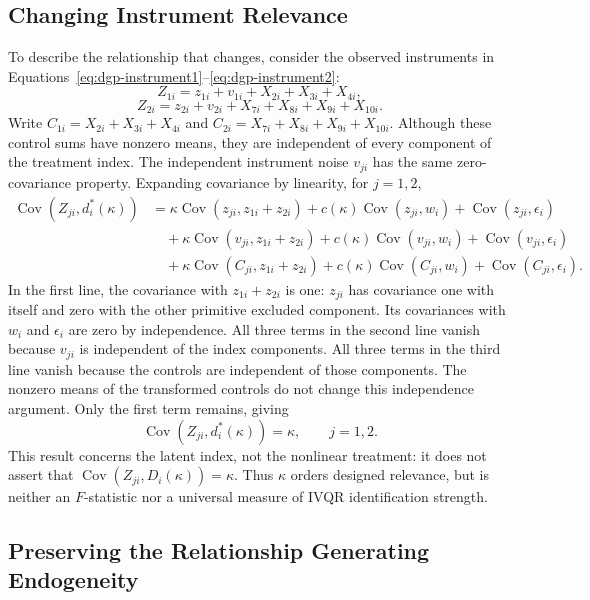 \subsection{Changing Instrument Relevance}

To describe the relationship that changes, consider the observed instruments in Equations~\eqref{eq:dgp-instrument1}--\eqref{eq:dgp-instrument2}:
\[
 Z_{1i}=z_{1i}+v_{1i}+X_{2i}+X_{3i}+X_{4i},
\]
\[
 Z_{2i}=z_{2i}+v_{2i}+X_{7i}+X_{8i}+X_{9i}+X_{10i}.
\]
Write $C_{1i}=X_{2i}+X_{3i}+X_{4i}$ and $C_{2i}=X_{7i}+X_{8i}+X_{9i}+X_{10i}$. Although these control sums have nonzero means, they are independent of every component of the treatment index. The independent instrument noise $v_{ji}$ has the same zero-covariance property. Expanding covariance by linearity, for $j=1,2$,
\begin{equation}
 \begin{aligned}
 \operatorname{Cov}(Z_{ji},d_i^*(\kappa))
 &=\kappa\operatorname{Cov}(z_{ji},z_{1i}+z_{2i})
   +c(\kappa)\operatorname{Cov}(z_{ji},w_i)
   +\operatorname{Cov}(z_{ji},\epsilon_i)\\
 &\quad+\kappa\operatorname{Cov}(v_{ji},z_{1i}+z_{2i})
   +c(\kappa)\operatorname{Cov}(v_{ji},w_i)
   +\operatorname{Cov}(v_{ji},\epsilon_i)\\
 &\quad+\kappa\operatorname{Cov}(C_{ji},z_{1i}+z_{2i})
   +c(\kappa)\operatorname{Cov}(C_{ji},w_i)
   +\operatorname{Cov}(C_{ji},\epsilon_i).
 \end{aligned}
 \label{eq:appendix-instrument-covariance}
\end{equation}
In the first line, the covariance with $z_{1i}+z_{2i}$ is one: $z_{ji}$ has covariance one with itself and zero with the other primitive excluded component. Its covariances with $w_i$ and $\epsilon_i$ are zero by independence. All three terms in the second line vanish because $v_{ji}$ is independent of the index components. All three terms in the third line vanish because the controls are independent of those components. The nonzero means of the transformed controls do not change this independence argument. Only the first term remains, giving
\[
 \operatorname{Cov}(Z_{ji},d_i^*(\kappa))=\kappa,\qquad j=1,2.
\]
This result concerns the latent index, not the nonlinear treatment: it does not assert that $\operatorname{Cov}(Z_{ji},D_i(\kappa))=\kappa$. Thus $\kappa$ orders designed relevance, but is neither an $F$-statistic nor a universal measure of IVQR identification strength.

\subsection{Preserving the Relationship Generating Endogeneity}

